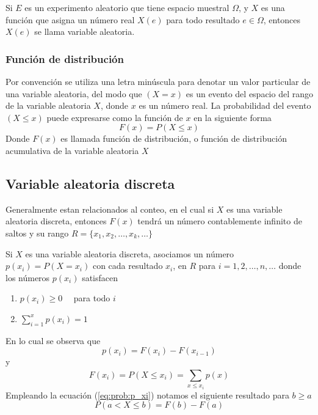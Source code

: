 \begin{definition}
	Si $E$ es un experimento aleatorio que tiene espacio muestral $\Omega$, y $X$ es una función que asigna un número real $X(e)$ para todo resultado $e \in \Omega$, entonces $X(e)$ se llama variable aleatoria.
\end{definition}

\subsubsection{Función de distribución}
Por convención se utiliza una letra minúscula para denotar un valor particular de una variable aleatoria, del modo que $(X=x)$ es un evento del espacio del rango de la variable aleatoria $X$, donde $x$ es un número real. La probabilidad del evento $(X \leq x)$ puede expresarse como la función de $x$ en la siguiente forma
\begin{equation}
	F(x)=P(X \leq x)
\end{equation}
Donde $F(x)$ es llamada función de distribución, o función de distribución acumulativa de la variable aleatoria $X$

\subsection{Variable aleatoria discreta}\label{VADiscreta}
Generalmente estan relacionados al conteo, en el cual si $X$ es una variable aleatoria discreta, entonces $F(x)$ tendrá un número contablemente infinito de saltos y su rango $R=\{{x}_{1},{x}_{2},\ldots,{x}_{k},\ldots\}$
\begin{definition}\label{defn_vadisc}
	Si $X$ es una variable aleatoria discreta, asociamos un número\\ $p({x}_{i})=P(X={x}_{i})$ con cada resultado ${x}_{i}$, en $R$ para $i=1,2, \ldots , n, \ldots$ donde los números $p({x}_{i})$ satisfacen
	\begin{enumerate}
		\item $p({x}_{i}) \geq 0 \quad$ para todo $i$
		\item $\sum\limits_{i = 1}^{x}p({x}_{i})=1$ 
	\end{enumerate}
\end{definition}
En lo cual se observa que 
\begin{equation}
	\label{eq:prob:p_xi}
	p({x}_{i})=F({x}_{i})-F({x}_{i-1})
\end{equation}
y
\begin{equation}
	\label{eq:prob:p_xi2}
	F({x}_{i})=P(X \leq {x}_{i}) = \sum\limits_{x \leq {x}_{i}}^{}p(x)
\end{equation}
Empleando la ecuación (\ref{eq:prob:p_xi}) notamos el siguiente resultado para $b \geq a$
\begin{equation}
	P(a < X \leq b) = F(b) - F(a)
\end{equation}

